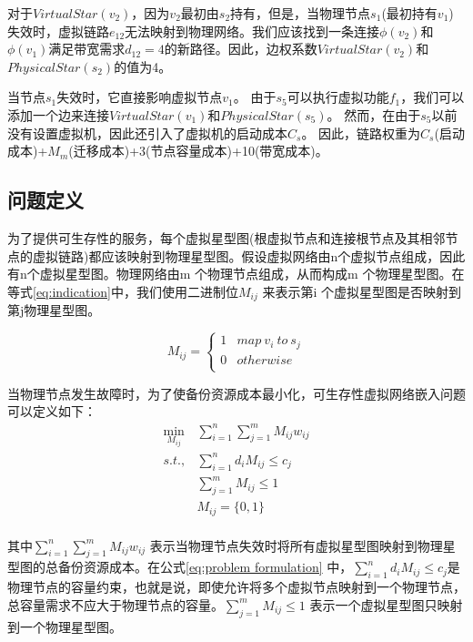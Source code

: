 对于$VirtualStar(v_2)$，因为$v_2$最初由$s_2$持有，但是，当物理节点$s_1$(最初持有$v_1$)失效时，虚拟链路$e_{12}$无法映射到物理网络。我们应该找到一条连接$\phi(v_2)$和$\phi(v_1)$满足带宽需求$d_{12}=4$的新路径。因此，边权系数$VirtualStar(v_2)$和$PhysicalStar(s_2)$的值为4。

当节点$s_1$失效时，它直接影响虚拟节点$v_1$。 由于$s_5$可以执行虚拟功能$f_1$，我们可以添加一个边来连接$VirtualStar(v_1)$和$PhysicalStar(s_5)$。 然而，在由于$s_5$以前没有设置虚拟机，因此还引入了虚拟机的启动成本$C_s$。 因此，链路权重为$C_s$(启动成本)+$M_m$(迁移成本)+3(节点容量成本)+10(带宽成本)。

\subsection{问题定义}
为了提供可生存性的服务，每个虚拟星型图(根虚拟节点和连接根节点及其相邻节点的虚拟链路)都应该映射到物理星型图。假设虚拟网络由n个虚拟节点组成，因此有n个虚拟星型图。物理网络由m 个物理节点组成，从而构成m 个物理星型图。在等式\ref{eq:indication}中，我们使用二进制位$M_{ij}$ 来表示第i 个虚拟星型图是否映射到第j物理星型图。

\begin{equation}
{M_{ij}} = \left\{ {\begin{array}{*{20}{c}}
   1 & {map \ v_i \  to  \ s_j}  \\
   0 & {otherwise}  \\
\end{array}} \right.
\label{eq:indication}
\end{equation}

当物理节点发生故障时，为了使备份资源成本最小化，可生存性虚拟网络嵌入问题可以定义如下：
\begin{equation}
\begin{array}{*{20}{c}}
   {\mathop {\min }\limits_{{M_{ij}}} } & {\sum\limits_{i = 1}^n {\sum\limits_{j = 1}^m {{M_{ij}}{w_{ij}}} } }  \\
   {s.t.,} & {\sum\limits_{i = 1}^n {{d_i}{M_{ij}}}  \le {c_j}}  \\
   {} & {\sum\limits_{j = 1}^m {{M_{ij}}}  \le 1}  \\
   {} & {{M_{ij}} = \{ 0,1\} }  \\
\end{array}
\label{eq:problem formulation}
\end{equation}

其中${\sum\limits_{i = 1}^n {\sum\limits_{j = 1}^m {{M_{ij}}{w_{ij}}} } }$ 表示当物理节点失效时将所有虚拟星型图映射到物理星型图的总备份资源成本。在公式\ref{eq:problem formulation} 中，${\sum\limits_{i = 1}^n {{d_i}{M_{ij}}}  \le {c_j}}$是物理节点的容量约束，也就是说，即使允许将多个虚拟节点映射到一个物理节点，总容量需求不应大于物理节点的容量。${\sum\limits_{j = 1}^m {{M_{ij}}}  \le 1}$ 表示一个虚拟星型图只映射到一个物理星型图。

